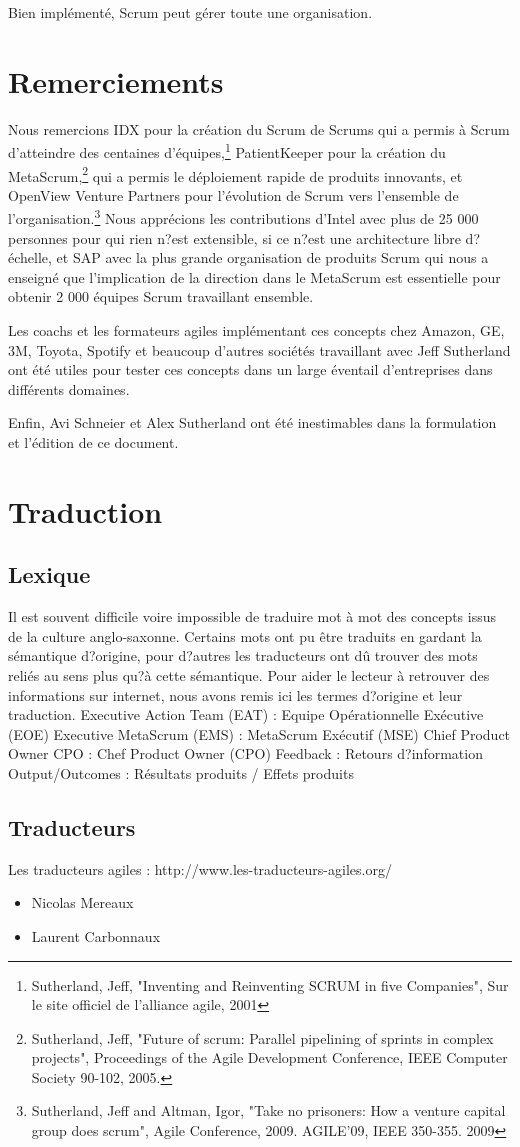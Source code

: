 \documentclass[12pt,a4paper,parskip=full]{scrartcl}
\begin{document}
Bien implémenté, Scrum peut gérer toute une organisation.

\section{Remerciements}
Nous remercions IDX pour la création du Scrum de Scrums qui a permis à Scrum
d'atteindre des centaines d'équipes,\footnote{Sutherland, Jeff,
"Inventing and Reinventing SCRUM in five Companies", Sur le site officiel
de l'alliance agile, 2001} PatientKeeper pour la création du MetaScrum,\footnote{Sutherland, Jeff, "Future of scrum: Parallel pipelining
of sprints in complex projects", Proceedings of the Agile Development
Conference,  IEEE Computer Society 90-102,  2005.} qui a
permis le déploiement rapide de produits innovants, et OpenView Venture Partners pour
l'évolution de Scrum vers l'ensemble de l'organisation.\footnote{Sutherland, Jeff and Altman,
Igor, "Take no prisoners: How a venture capital group does scrum", Agile
Conference, 2009. AGILE'09, IEEE 350-355.  2009} Nous apprécions les contributions
d'Intel avec plus de 25 000 personnes pour qui rien n?est extensible, si ce n?est une
architecture libre d?échelle, et SAP avec la plus grande organisation de produits Scrum qui
nous a enseigné que l'implication de la direction dans le MetaScrum est essentielle pour
obtenir 2 000 équipes Scrum travaillant ensemble.

Les coachs et les formateurs agiles implémentant ces concepts chez Amazon, GE, 3M,
Toyota, Spotify et beaucoup d'autres sociétés travaillant avec Jeff Sutherland ont été utiles
pour tester ces concepts dans un large éventail d'entreprises dans différents domaines.

Enfin, Avi Schneier et Alex Sutherland ont été inestimables dans la formulation 
et l'édition de ce document.

\pagebreak

\printbibliography

\pagebreak

\section{Traduction}
\subsection{Lexique}
Il est souvent difficile voire impossible de traduire mot à mot des concepts issus de la
culture anglo-saxonne. Certains mots ont pu être traduits en gardant la sémantique
d?origine, pour d?autres les traducteurs ont dû trouver des mots reliés au sens plus qu?à
cette sémantique. Pour aider le lecteur à retrouver des informations sur internet, nous
avons remis ici les termes d?origine et leur traduction.
Executive Action Team (EAT) : Equipe Opérationnelle Exécutive (EOE)
Executive MetaScrum (EMS) : MetaScrum Exécutif (MSE)
Chief Product Owner CPO : Chef Product Owner (CPO)
Feedback : Retours d?information
Output/Outcomes : Résultats produits / Effets produits
\subsection{Traducteurs}
Les traducteurs agiles : http://www.les-traducteurs-agiles.org/
\begin{itemize}
\item Nicolas Mereaux
\item Laurent Carbonnaux
\end{itemize}
\end{document}
